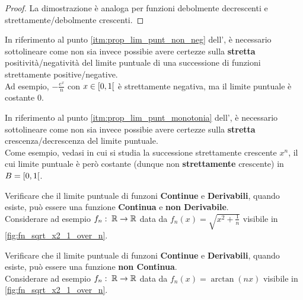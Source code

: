 \begin{exercise}
\begin{solution}
\begin{enumerate}
\begin{proof}
					La dimostrazione è analoga per funzioni debolmente decrescenti e strettamente/debolmente crescenti.
					\let\qed\relax %
				\end{proof}
			\vspace*{-2\baselineskip} %
		\end{enumerate}
	\end{solution}
\end{exercise}
\begin{observation}
	In riferimento al punto \ref{itm:prop_lim_punt_non_neg} dell', è necessario sottolineare come non sia invece possibie avere certezze sulla \textbf{stretta} positività/negatività del limite puntuale di una successione di funzioni strettamente positive/negative.\\
	Ad esempio, $-\frac{e^x}{n}$ con $x \in \left[0,1\right[$ è strettamente negativa, ma il limite puntuale è costante $0$.
\end{observation}
\begin{observation}
	In riferimento al punto \ref{itm:prop_lim_punt_monotonia} dell', è necessario sottolineare come non sia invece possibie avere certezze sulla \textbf{stretta} crescenza/decrescenza del limite puntuale.\\
	Come esempio, vedasi  in cui si studia la successione strettamente crescente $x^n$, il cui limite puntuale è però costante (dunque non \textbf{strettamente} crescente) in $B = \left[0,1\right[$.
\end{observation}
\begin{exercise}
	Verificare che il limite puntuale di funzoni \textbf{Continue} e \textbf{Derivabili}, quando esiste, può essere una funzione \textbf{Continua} e \textbf{non Derivabile}.\\
	Considerare ad esempio $f_n:\; \mathbb{R} \to \mathbb{R}$ data da $f_n(x) = \sqrt{x^2 + \frac{1}{n}}$ visibile in \cref{fig:fn_sqrt_x2_1_over_n}.
\end{exercise}
\begin{exercise}
	Verificare che il limite puntuale di funzoni \textbf{Continue} e \textbf{Derivabili}, quando esiste, può essere una funzione \textbf{non Continua}.\\
	Considerare ad esempio $f_n:\; \mathbb{R} \to \mathbb{R}$ data da $f_n(x) = \arctan(nx)$ visibile in \cref{fig:fn_sqrt_x2_1_over_n}.
\end{exercise}
